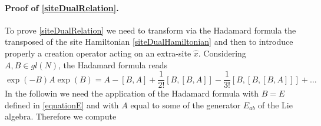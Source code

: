 \documentclass[11pt]{article}
\numberwithin{equation}{section}
\numberwithin{equation}{subsection}
\begin{document}
 \paragraph{Proof of \eqref{siteDualRelation}.} To prove \eqref{siteDualRelation} we need to transform via the Hadamard formula the transposed of the site Hamiltonian \eqref{siteDualHamiltonian} and then to  introduce properly a creation operator acting on an extra-site $\widehat{x}$. %
 Considering $A,B\in gl(N)$, the Hadamard formula reads 
 \begin{equation}\label{HadamardFormula}
     \exp{(-B)}A\exp{(B)}=A-\left[B,A\right]+\frac{1}{2!}\left[B,\left[B,A\right]\right]-\frac{1}{3!}\left[B,\left[B,\left[B,A\right]\right]\right]+\ldots
 \end{equation}
In the followin we need the application of the Hadamard formula with $B=E$ defined in \eqref{equationE} and with $A$ equal to some of the generator $E_{ab}$ of the Lie algebra. Therefore we compute 
\end{document}
